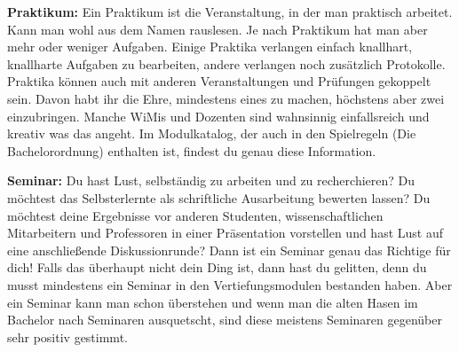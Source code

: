\textbf{Praktikum: }
Ein Praktikum ist die Veranstaltung, in der man praktisch arbeitet. Kann man wohl aus dem Namen rauslesen. Je nach Praktikum hat man aber mehr oder weniger Aufgaben. Einige Praktika verlangen einfach knallhart, knallharte Aufgaben zu bearbeiten, andere verlangen noch zusätzlich Protokolle. Praktika können auch mit anderen Veranstaltungen und Prüfungen gekoppelt sein. Davon habt ihr die Ehre, mindestens eines zu machen, höchstens aber zwei einzubringen. Manche WiMis und Dozenten sind wahnsinnig einfallsreich und kreativ was das angeht. Im Modulkatalog, der auch in den Spielregeln (Die Bachelorordnung) enthalten ist, findest du genau diese Information. 

\textbf{Seminar: }
Du hast Lust, selbständig zu arbeiten und zu recherchieren? Du möchtest das Selbsterlernte als schriftliche Ausarbeitung bewerten lassen? Du möchtest deine Ergebnisse vor anderen Studenten, wissenschaftlichen Mitarbeitern und Professoren in einer Präsentation vorstellen und hast Lust auf eine anschließende Diskussionrunde? Dann ist ein Seminar genau das Richtige für dich! Falls das überhaupt nicht dein Ding ist, dann hast du gelitten, denn du musst mindestens ein Seminar in den Vertiefungsmodulen bestanden haben. Aber ein Seminar kann man schon überstehen und wenn man die alten Hasen im Bachelor nach Seminaren ausquetscht, sind diese meistens Seminaren gegenüber sehr positiv gestimmt.
\spaltenende
